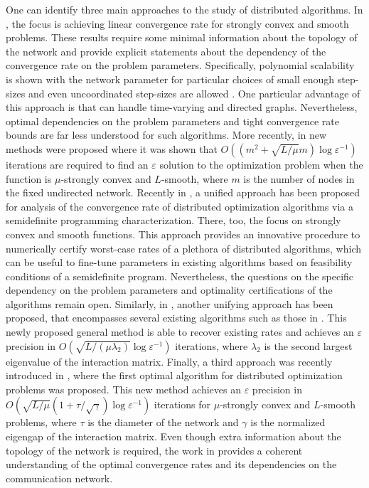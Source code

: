 \documentclass[final]{siamart1116}
\numberwithin{theorem}{section}
\begin{document}
	One can identify three main approaches to the study of distributed algorithms. In \cite{ned16w,ned17,ned17r}, the focus is achieving linear convergence rate for strongly convex and smooth problems. These results require some minimal information about the topology of the network and provide explicit statements about the dependency of the convergence rate on the problem parameters. Specifically, polynomial scalability is shown with the network parameter for particular choices of small enough step-sizes and even uncoordinated step-sizes are allowed \cite{ned17r}. One particular advantage of this approach is that can handle time-varying and directed graphs. Nevertheless, optimal dependencies on the problem parameters and tight convergence rate bounds are far less understood for such algorithms. More recently, in \cite{ned17} new methods were proposed where it was shown that $O((m^2 + \sqrt{L/\mu}m)\log \varepsilon^{-1})$ iterations are required to find an $\varepsilon$ solution to the optimization problem when the function is $\mu$-strongly convex and $L$-smooth, where $m$ is the number of nodes in the fixed undirected network. Recently in \cite{sun17}, a unified approach has been proposed for analysis of the convergence rate of distributed optimization algorithms via a semidefinite programming characterization. There, too, the focus on strongly convex and smooth functions. This approach provides an innovative procedure to numerically certify worst-case rates of a plethora of distributed algorithms, which can be useful to fine-tune parameters in existing algorithms based on feasibility conditions of a semidefinite program. Nevertheless, the questions on the specific dependency on the problem parameters and optimality certifications of the algorithms remain open. Similarly, in \cite{jak17}, another unifying approach has been proposed, that encompasses several existing algorithms such as those in \cite{shi15,qu17}. This newly proposed general method is able to recover existing rates and achieves an $\varepsilon$ precision in $O(\sqrt{L/ (\mu \lambda_2)} \log \varepsilon^{-1})$ iterations, where $\lambda_2$ is the second largest eigenvalue of the interaction matrix. Finally, a third approach was recently introduced in \cite{sca17}, where the first optimal algorithm for distributed optimization problems was proposed. This new method achieves an $\varepsilon$ precision in $O(\sqrt{L/\mu}(1 + \tau / \sqrt{\gamma}) \log \varepsilon^{-1})$ iterations for \mbox{$\mu$-strongly} convex and $L$-smooth problems, where $\tau$ is the diameter of the network and $\gamma$ is the normalized eigengap of the interaction matrix. Even though extra information about the topology of the network is required, the work in \cite{sca17} provides a coherent understanding of the optimal convergence rates and its dependencies on the communication network.
	
\end{document}
